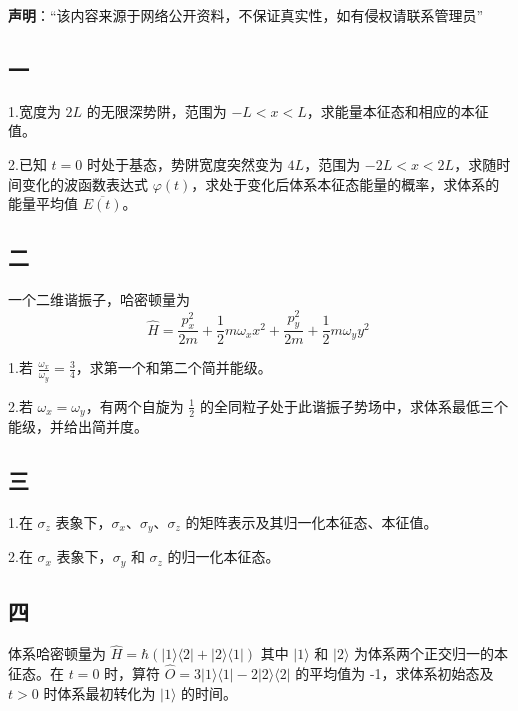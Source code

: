 
\textbf{声明}：“该内容来源于网络公开资料，不保证真实性，如有侵权请联系管理员”

\subsection{一}
1.宽度为 $2L$ 的无限深势阱，范围为 $-L < x < L$，求能量本征态和相应的本征值。

2.已知 $t = 0$ 时处于基态，势阱宽度突然变为 $4L$，范围为 $-2L < x < 2L$，求随时间变化的波函数表达式 $\varphi(t)$，求处于变化后体系本征态能量的概率，求体系的能量平均值 $\overline{E(t)}$。
\subsection{二}
一个二维谐振子，哈密顿量为
$$\hat{H} = \frac{p_x^2}{2m} + \frac{1}{2} m \omega_x x^2 + \frac{p_y^2}{2m} + \frac{1}{2} m \omega_y y^2~$$

1.若 $\frac{\omega_x}{\omega_y} = \frac{3}{4}$，求第一个和第二个简并能级。

2.若 $\omega_x = \omega_y$，有两个自旋为 $\frac{1}{2}$ 的全同粒子处于此谐振子势场中，求体系最低三个能级，并给出简并度。
\subsection{三}
1.在 $\sigma_z$ 表象下，$\sigma_x$、$\sigma_y$、$\sigma_z$ 的矩阵表示及其归一化本征态、本征值。

2.在 $\sigma_x$ 表象下，$\sigma_y$ 和 $\sigma_z$ 的归一化本征态。
\subsection{四}
体系哈密顿量为
$\hat{H} = \hbar( |1\rangle \langle 2| + |2\rangle \langle 1| )$
其中 $|1\rangle$ 和 $|2\rangle$ 为体系两个正交归一的本征态。在 $t=0$ 时，算符
$\hat{O} = 3 |1\rangle \langle 1| - 2 |2\rangle \langle 2|$
的平均值为 -1，求体系初始态及 $t > 0$ 时体系最初转化为 $|1\rangle$ 的时间。

